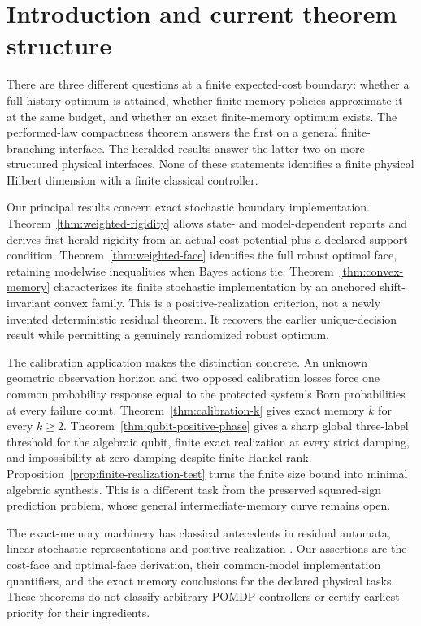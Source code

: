 \section{Introduction and current theorem structure}\label{sec:current-overview}\label{sec:introduction}
There are three different questions at a finite expected-cost boundary: whether a full-history optimum is attained, whether finite-memory policies approximate it at the same budget, and whether an exact finite-memory optimum exists. The performed-law compactness theorem answers the first on a general finite-branching interface. The heralded results answer the latter two on more structured physical interfaces. None of these statements identifies a finite physical Hilbert dimension with a finite classical controller.

Our principal results concern exact stochastic boundary implementation. Theorem~\ref{thm:weighted-rigidity} allows state- and model-dependent reports and derives first-herald rigidity from an actual cost potential plus a declared support condition. Theorem~\ref{thm:weighted-face} identifies the full robust optimal face, retaining modelwise inequalities when Bayes actions tie. Theorem~\ref{thm:convex-memory} characterizes its finite stochastic implementation by an anchored shift-invariant convex family. This is a positive-realization criterion, not a newly invented deterministic residual theorem. It recovers the earlier unique-decision result while permitting a genuinely randomized robust optimum.

The calibration application makes the distinction concrete. An unknown geometric observation horizon and two opposed calibration losses force one common probability response equal to the protected system's Born probabilities at every failure count. Theorem~\ref{thm:calibration-k} gives exact memory $k$ for every $k\ge2$. Theorem~\ref{thm:qubit-positive-phase} gives a sharp global three-label threshold for the algebraic qubit, finite exact realization at every strict damping, and impossibility at zero damping despite finite Hankel rank. Proposition~\ref{prop:finite-realization-test} turns the finite size bound into minimal algebraic synthesis. This is a different task from the preserved squared-sign prediction problem, whose general intermediate-memory curve remains open.

The exact-memory machinery has classical antecedents in residual automata, linear stochastic representations and positive realization \cite{RabinScott59,Jaeger00,ThonJaeger15,MonrasWinter14}. Our assertions are the cost-face and optimal-face derivation, their common-model implementation quantifiers, and the exact memory conclusions for the declared physical tasks. These theorems do not classify arbitrary POMDP controllers or certify earliest priority for their ingredients.

